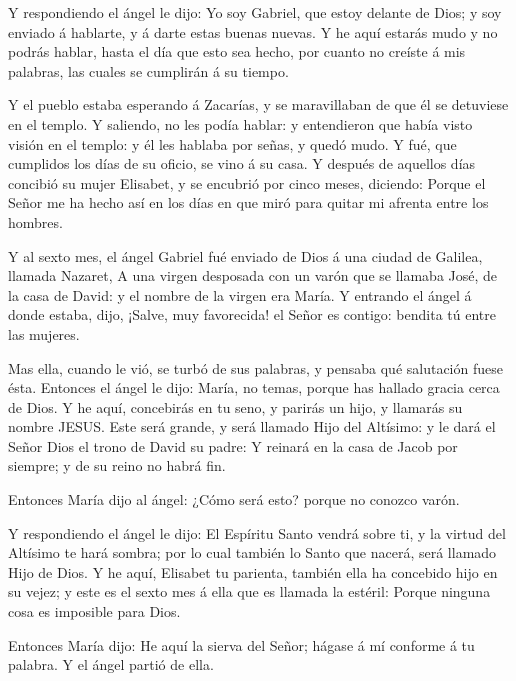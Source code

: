  Y respondiendo el ángel le dijo: Yo soy Gabriel, que estoy
delante de Dios; y soy enviado á hablarte, y á darte estas buenas
nuevas.  Y he aquí estarás mudo y no podrás hablar, hasta
el día que esto sea hecho, por cuanto no creíste á mis palabras, las
cuales se cumplirán á su tiempo.

 Y el pueblo estaba esperando á Zacarías, y se maravillaban
de que él se detuviese en el templo.  Y saliendo, no les
podía hablar: y entendieron que había visto visión en el templo: y él
les hablaba por señas, y quedó mudo.  Y fué, que cumplidos
los días de su oficio, se vino á su casa.  Y después de
aquellos días concibió su mujer Elisabet, y se encubrió por cinco meses,
diciendo:  Porque el Señor me ha hecho así en los días en
que miró para quitar mi afrenta entre los hombres.

 Y al sexto mes, el ángel Gabriel fué enviado de Dios á una
ciudad de Galilea, llamada Nazaret,  A una virgen desposada
con un varón que se llamaba José, de la casa de David: y el nombre de la
virgen era María.  Y entrando el ángel á donde estaba,
dijo, ¡Salve, muy favorecida! el Señor es contigo: bendita tú entre las
mujeres.

 Mas ella, cuando le vió, se turbó de sus palabras, y
pensaba qué salutación fuese ésta.  Entonces el ángel le
dijo: María, no temas, porque has hallado gracia cerca de Dios.
 Y he aquí, concebirás en tu seno, y parirás un hijo, y
llamarás su nombre JESUS.  Este será grande, y será llamado
Hijo del Altísimo: y le dará el Señor Dios el trono de David su padre:
 Y reinará en la casa de Jacob por siempre; y de su reino
no habrá fin.

 Entonces María dijo al ángel: ¿Cómo será esto? porque no
conozco varón.

 Y respondiendo el ángel le dijo: El Espíritu Santo vendrá
sobre ti, y la virtud del Altísimo te hará sombra; por lo cual también
lo Santo que nacerá, será llamado Hijo de Dios.  Y he aquí,
Elisabet tu parienta, también ella ha concebido hijo en su vejez; y este
es el sexto mes á ella que es llamada la estéril:  Porque
ninguna cosa es imposible para Dios.

 Entonces María dijo: He aquí la sierva del Señor; hágase á
mí conforme á tu palabra. Y el ángel partió de ella.

